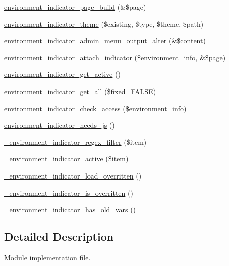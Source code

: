 \begin{DoxyCompactItemize}
\item 
\hyperlink{environment__indicator_8module_a454f8d125a4f28ac13cebd6d21df1dee}{environment\_\-indicator\_\-page\_\-build} (\&\$page)
\item 
\hyperlink{environment__indicator_8module_a66c8bc2c0f18f3e23b56a62ef94c1b99}{environment\_\-indicator\_\-theme} (\$existing, \$type, \$theme, \$path)
\item 
\hyperlink{environment__indicator_8module_afa135a9c430720e0a719bb632e52baa4}{environment\_\-indicator\_\-admin\_\-menu\_\-output\_\-alter} (\&\$content)
\item 
\hyperlink{environment__indicator_8module_ad423047f81edbbe6b20b7a45473f8d02}{environment\_\-indicator\_\-attach\_\-indicator} (\$environment\_\-info, \&\$page)
\item 
\hyperlink{environment__indicator_8module_aa06d8e1c77d18fa0f4d06be742140263}{environment\_\-indicator\_\-get\_\-active} ()
\item 
\hyperlink{environment__indicator_8module_acd0e8c886d4a9dfeb7a51e5ca2b21128}{environment\_\-indicator\_\-get\_\-all} (\$fixed=FALSE)
\item 
\hyperlink{environment__indicator_8module_aa0667e307732cf17ae0c7a4065769d6b}{environment\_\-indicator\_\-check\_\-access} (\$environment\_\-info)
\item 
\hyperlink{environment__indicator_8module_a177431cf8784daef5b7e3a5ba3fd0702}{environment\_\-indicator\_\-needs\_\-js} ()
\item 
\hyperlink{environment__indicator_8module_a140b94f207e229d100205c286b5102b9}{\_\-environment\_\-indicator\_\-regex\_\-filter} (\$item)
\item 
\hyperlink{environment__indicator_8module_a46d89d07db2d1e0a3a95ce4b3df09905}{\_\-environment\_\-indicator\_\-active} (\$item)
\item 
\hyperlink{environment__indicator_8module_a92d8ee8403b8c5fe64d074c0aca22ec0}{\_\-environment\_\-indicator\_\-load\_\-overritten} ()
\item 
\hyperlink{environment__indicator_8module_a982d48970210a65eb977a31d44882074}{\_\-environment\_\-indicator\_\-is\_\-overritten} ()
\item 
\hyperlink{environment__indicator_8module_a31830bb8df3306f60e554928e4ba741d}{\_\-environment\_\-indicator\_\-has\_\-old\_\-vars} ()
\end{DoxyCompactItemize}


\subsection{Detailed Description}
Module implementation file. 

